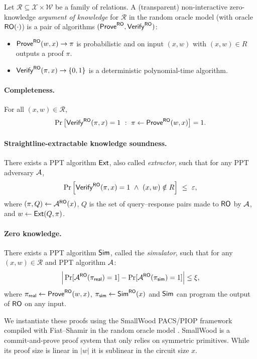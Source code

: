 \begin{definition}\label{def:nizk-ark}
Let $\mathcal{R}\subseteq \mathcal{X}\times \mathcal{W}$  be a family of relations.
A (transparent) non-interactive zero-knowledge \emph{argument of knowledge} for $\mathcal{R}$ in the random oracle model
(with oracle $\mathsf{RO}(\cdot)$) is a pair of algorithms $(\mathsf{Prove}^{\mathsf{RO}},\mathsf{Verify}^{\mathsf{RO}})$:
\begin{itemize}[leftmargin=1.25em]
  \item $\mathsf{Prove}^{\mathsf{RO}}(w ,x)\to \pi$ is probabilistic and on input $(x,w)$ with
  $(x,w)\in R$ outputs a proof $\pi$.
  \item $\mathsf{Verify}^{\mathsf{RO}}(\pi,x)\to \{0,1\}$ is a deterministic polynomial-time algorithm.
\end{itemize}

\paragraph{Completeness.}
For all $(x,w)\in\mathcal{R}$,
\[
  \Pr\big[\ZKVerify^{\RO}(\pi,x)=1 \ :\ \pi\gets \ZKProve^{\RO}(w,x)\big]=1.
\]

\paragraph{Straightline-extractable knowledge soundness.}
There exists a PPT algorithm $\mathsf{Ext}$, also called \emph{extractor}, such that for any PPT adversary $\mathcal{A}$,
\[
  \Pr\Big[
    \mathsf{Verify}^{\mathsf{RO}}(\pi,x)=1 \ \wedge\ (x,w)\notin R
  \Big]\ \le\ \varepsilon,
\]
where $(\pi,Q)\leftarrow \mathcal{A}^{\mathsf{RO}}(x)$, $Q$ is the set of query--response pairs made to $\mathsf{RO}$ by $\mathcal{A}$,
and $w\leftarrow \mathsf{Ext}(Q,\pi)$.

\paragraph{Zero knowledge.}
There exists a PPT algorithm $\mathsf{Sim}$, called the \emph{simulator}, such that for any $(x,w)\in \mathcal{R}$ and PPT algorithm $\mathcal{A}$:
\[
  \Big|\Pr[\mathcal{A}^{\mathsf{RO}}(\pi_{\mathsf{real}})=1]-\Pr[\mathcal{A}^{\mathsf{RO}}(\pi_{\mathsf{sim}})=1]\Big|
  \le \xi,
\]
where $\pi_{\mathsf{real}}\gets \mathsf{Prove}^{\mathsf{RO}}(w ,x)$,  $\pi_{\mathsf{sim}}\gets \mathsf{Sim}^{\mathsf{RO}}(x)$ and $\mathsf{Sim}$ can program the output of $\mathsf{RO}$ on any input.
\end{definition}

We instantiate these proofs using the SmallWood PACS/PIOP framework compiled with Fiat--Shamir in the random oracle
model \cite{EPRINT:FenRiv25b}. SmallWood is a commit-and-prove proof system that only relies on symmetric primitives. While its proof size is linear in $|w|$ it is sublinear in the circuit size $x$.

